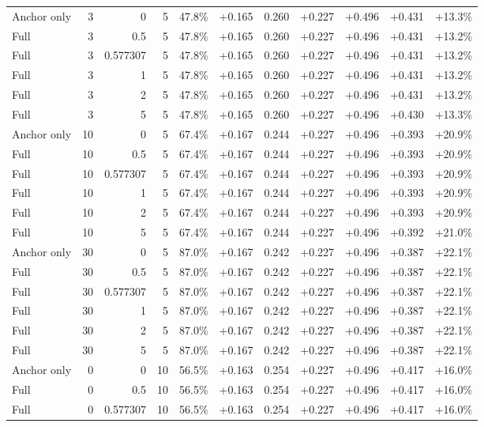 \begin{table}[htbp]
\begin{tabular}{lrrrccccccc}
Anchor only & 3 & 0 & 5 & 47.8\% & +0.165 & 0.260 & +0.227 & +0.496 & +0.431 & +13.3\% \\
Full & 3 & 0.5 & 5 & 47.8\% & +0.165 & 0.260 & +0.227 & +0.496 & +0.431 & +13.2\% \\
Full & 3 & 0.577307 & 5 & 47.8\% & +0.165 & 0.260 & +0.227 & +0.496 & +0.431 & +13.2\% \\
Full & 3 & 1 & 5 & 47.8\% & +0.165 & 0.260 & +0.227 & +0.496 & +0.431 & +13.2\% \\
Full & 3 & 2 & 5 & 47.8\% & +0.165 & 0.260 & +0.227 & +0.496 & +0.431 & +13.2\% \\
Full & 3 & 5 & 5 & 47.8\% & +0.165 & 0.260 & +0.227 & +0.496 & +0.430 & +13.3\% \\
Anchor only & 10 & 0 & 5 & 67.4\% & +0.167 & 0.244 & +0.227 & +0.496 & +0.393 & +20.9\% \\
Full & 10 & 0.5 & 5 & 67.4\% & +0.167 & 0.244 & +0.227 & +0.496 & +0.393 & +20.9\% \\
Full & 10 & 0.577307 & 5 & 67.4\% & +0.167 & 0.244 & +0.227 & +0.496 & +0.393 & +20.9\% \\
Full & 10 & 1 & 5 & 67.4\% & +0.167 & 0.244 & +0.227 & +0.496 & +0.393 & +20.9\% \\
Full & 10 & 2 & 5 & 67.4\% & +0.167 & 0.244 & +0.227 & +0.496 & +0.393 & +20.9\% \\
Full & 10 & 5 & 5 & 67.4\% & +0.167 & 0.244 & +0.227 & +0.496 & +0.392 & +21.0\% \\
Anchor only & 30 & 0 & 5 & 87.0\% & +0.167 & 0.242 & +0.227 & +0.496 & +0.387 & +22.1\% \\
Full & 30 & 0.5 & 5 & 87.0\% & +0.167 & 0.242 & +0.227 & +0.496 & +0.387 & +22.1\% \\
Full & 30 & 0.577307 & 5 & 87.0\% & +0.167 & 0.242 & +0.227 & +0.496 & +0.387 & +22.1\% \\
Full & 30 & 1 & 5 & 87.0\% & +0.167 & 0.242 & +0.227 & +0.496 & +0.387 & +22.1\% \\
Full & 30 & 2 & 5 & 87.0\% & +0.167 & 0.242 & +0.227 & +0.496 & +0.387 & +22.1\% \\
Full & 30 & 5 & 5 & 87.0\% & +0.167 & 0.242 & +0.227 & +0.496 & +0.387 & +22.1\% \\
Anchor only & 0 & 0 & 10 & 56.5\% & +0.163 & 0.254 & +0.227 & +0.496 & +0.417 & +16.0\% \\
Full & 0 & 0.5 & 10 & 56.5\% & +0.163 & 0.254 & +0.227 & +0.496 & +0.417 & +16.0\% \\
Full & 0 & 0.577307 & 10 & 56.5\% & +0.163 & 0.254 & +0.227 & +0.496 & +0.417 & +16.0\% \\

\end{tabular}
\end{table}
